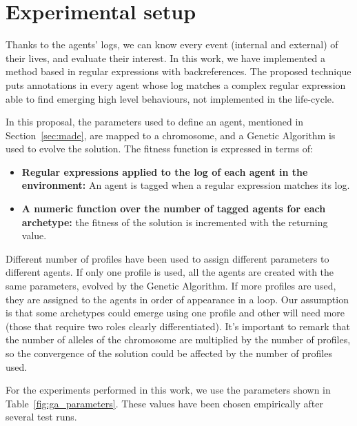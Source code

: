\documentclass[runningheads]{llncs}
\begin{document}

\section{Experimental setup}
\label{sec:experimentalsetup}

Thanks to the agents' logs, we can know every event (internal and external) of their lives, and evaluate their interest. In this work, we have implemented a method based in regular expressions with backreferences. The proposed technique puts annotations in every agent whose log matches a complex regular expression able to find emerging high level behaviours, not implemented in the life-cycle. 

In this proposal, the parameters used to define an agent, mentioned in Section~\ref{sec:made}, are mapped to a chromosome, and a Genetic Algorithm is used to evolve the solution. The fitness function is expressed in terms of:

\begin{itemize}
\item \textbf{Regular expressions applied to the log of each agent in the environment:} An agent is tagged when a regular expression matches its log.
\item \textbf{A numeric function over the number of tagged agents for each archetype:} the fitness of the solution is incremented with the returning value.
\end{itemize}

Different number of profiles have been used to assign different parameters to different agents. If only one profile is used, all the agents are created with the same parameters, evolved by the Genetic Algorithm. If more profiles are used, they are assigned to the agents in order of appearance in a loop. Our assumption is that some archetypes could emerge using one profile and other will need more (those that require two roles clearly differentiated). It's important to remark that the number of alleles of the chromosome are multiplied by the number of profiles, so the convergence of the solution could be affected by the number of profiles used.

For the experiments performed in this work, we use the parameters shown in Table~\ref{fig:ga_parameters}. These values have been chosen empirically after several test runs. 
\end{document}
